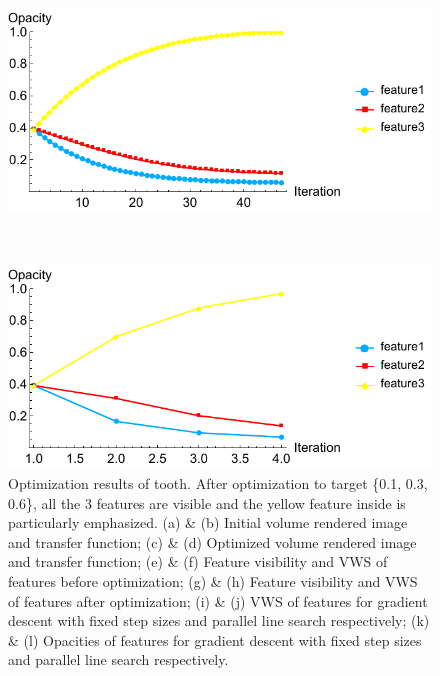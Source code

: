 \begin{figure}
	\begin{minipage}{.49\textwidth}
		\includegraphics[width=1\linewidth]{figures/tooth_naive_opacity_fixed}
		\subcaption{}
	\end{minipage}~
	\begin{minipage}{.49\textwidth}
		\includegraphics[width=1\linewidth]{figures/tooth_naive_opacity_parallelsearch}
		\subcaption{}
	\end{minipage}
	\caption[Optimization results of tooth]
	{Optimization results of tooth. After optimization to target \{0.1, 0.3, 0.6\}, all the 3 features are visible and the yellow feature inside is particularly emphasized.
	(a) \& (b) Initial volume rendered image and transfer function; (c) \& (d) Optimized volume rendered image and transfer function; (e) \& (f) Feature visibility and VWS of features before optimization; (g) \& (h) Feature visibility and VWS of features after optimization; (i) \& (j) VWS of features for gradient descent with fixed step sizes and parallel line search respectively; (k) \& (l) Opacities of features for gradient descent with fixed step sizes and parallel line search respectively.}
	\label{fig:tooth_naive_optimized}
\end{figure}

